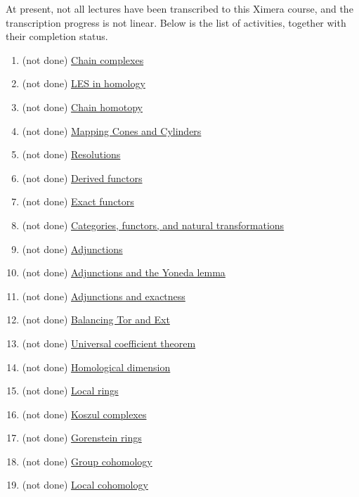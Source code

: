 \documentclass{ximera}
\begin{document}
At present, not all lectures have been transcribed to this Ximera
course, and the transcription progress is not linear.  Below is the
list of activities, together with their completion status.

\begin{enumerate}
\item (not done) \href{/activity/chainComplexes/chainComplexes/}{Chain complexes}
\item (not done) \href{/activity/lesInHomology/lesInHomology/}{LES in homology}
\item (not done) \href{/activity/chainHomotopy/chainHomotopy/}{Chain homotopy}
\item (not done) \href{/activity/mappingConesAndCylinders/mappingConesAndCylinders/}{Mapping Cones and Cylinders}
\item (not done) \href{/activity/resolutions/resolutions/}{Resolutions}
\item (not done) \href{/activity/derivedFunctors/derivedFunctors/}{Derived functors}
\item (not done) \href{/activity/exactFunctors/exactFunctors/}{Exact functors}
\item (not done) \href{/activity/categoriesFunctorsAndNaturalTransformations/categoriesFunctorsAndNaturalTransformations/}{Categories, functors, and natural transformations}
\item (not done) \href{/activity/adjunctions/adjunctions/}{Adjunctions}
\item (not done) \href{/activity/adjunctionsAndTheYonedaLemma/adjunctionsAndTheYonedaLemma/}{Adjunctions and the Yoneda lemma}
\item (not done) \href{/activity/adjunctionsAndExactness/adjunctionsAndExactness/}{Adjunctions and exactness}
\item (not done) \href{/activity/balancingTorAndExt/balancingTorAndExt/}{Balancing Tor and Ext}
\item (not done) \href{/activity/universalCoefficientTheorem/universalCoefficientTheorem/}{Universal coefficient theorem}
\item (not done) \href{/activity/homologicalDimension/homologicalDimension/}{Homological dimension}
\item (not done) \href{/activity/localRings/localRings/}{Local rings}
\item (not done) \href{/activity/koszulComplexes/koszulComplexes/}{Koszul complexes}
\item (not done) \href{/activity/gorensteinRings/gorensteinRings/}{Gorenstein rings}
\item (not done) \href{/activity/groupCohomology/groupCohomology/}{Group cohomology}
\item (not done) \href{/activity/localCohomology/localCohomology/}{Local cohomology}
\end{enumerate}
\end{document}
